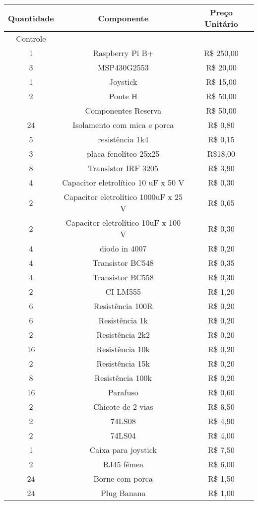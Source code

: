\begin{longtable}{|c|c|c|} 
\hline
Quantidade & Componente & Preço Unitário \\ \hline
Controle &  &  \\
1 & Raspberry Pi B+ & R\$ 250,00 \\
3 & MSP430G2553 & R\$ 20,00 \\
1 & Joystick & R\$ 15,00 \\
2 & Ponte H & R\$ 50,00 \\
  & Componentes Reserva & R\$ 50,00 \\
24 & Isolamento com mica e porca & R\$ 0,80 \\
5 & resistência 1k4 & R\$ 0,15 \\
3 & placa fenolíteo 25x25 & R\$18,00 \\
8 & Transistor IRF 3205 & R\$ 3,90 \\
4 & Capacitor eletrolítico 10 uF x 50 V & R\$ 0,30 \\
2 & Capacitor eletrolítico 1000uF x 25 V & R\$ 0,65 \\
2 & Capacitor eletrolítico 10uF x 100 V & R\$ 0,30 \\
4 & diodo in 4007 & R\$ 0,20 \\
4 & Transistor BC548 & R\$ 0,35 \\
4 & Transistor BC558 & R\$ 0,30 \\
2 & CI LM555 & R\$ 1,20 \\
6 & Resistência 100R & R\$ 0,20 \\
6 & Resistência 1k & R\$ 0,20 \\
2 & Resistência 2k2 & R\$ 0,20 \\
16 & Resistência 10k & R\$ 0,20 \\
2 & Resistência 15k & R\$ 0,20 \\
8 & Resistência 100k & R\$ 0,20 \\
16 & Parafuso & R\$ 0,60 \\
2 & Chicote de 2 vias & R\$ 6,50 \\
2 & 74LS08 & R\$ 4,90 \\
2 & 74LS04 & R\$ 4,00 \\
1 & Caixa para joystick & R\$ 7,50 \\
2 & RJ45 fêmea & R\$ 6,00 \\	
24 & Borne com porca & R\$ 1,50 \\
24 & Plug Banana & R\$ 1,00 \\

\end{longtable}
